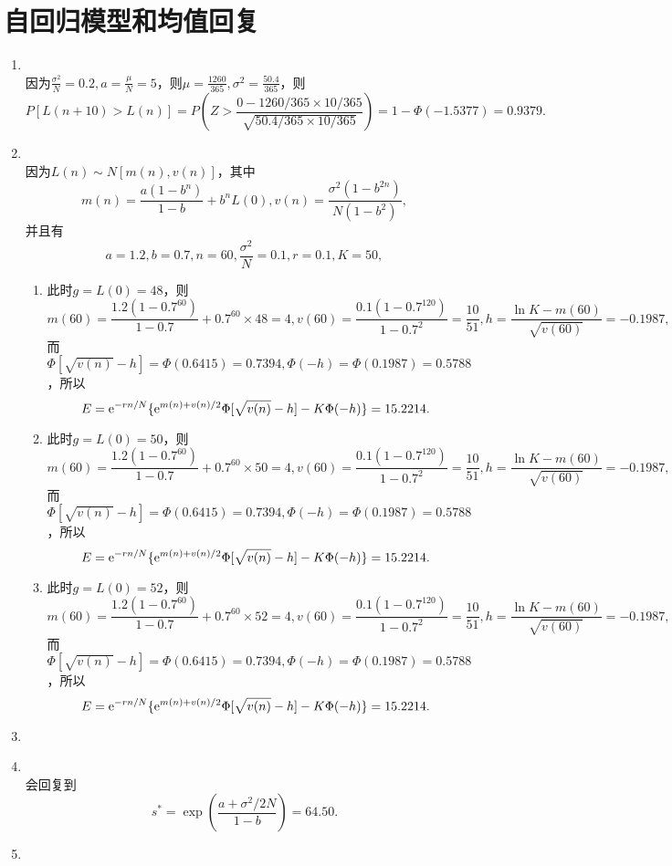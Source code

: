 \section{自回归模型和均值回复}
\begin{enumerate}[label=\arabic{section}.\arabic*]
    \item \sol\\
    因为$\displaystyle \frac{\sigma^2}{N}=0.2, a=\frac{\mu}{N}=5$，则$\displaystyle\mu=\frac{1260}{365},\sigma^2=\frac{50.4}{365}$，则
    \[P[L(n+10)>L(n)]=P\left(Z>\frac{0-1260/365 \times 10/365}{\sqrt{50.4/365 \times 10/365}}\right)=1-\Phi(-1.5377)=0.9379.\]
    \item \sol\\
    因为$L(n) \sim N[m(n), v(n)]$，其中
    \[m(n)=\frac{a(1-b^n)}{1-b}+b^n L(0),v(n)=\frac{\sigma^2(1-b^{2n})}{N(1-b^2)},\]
    并且有\[a=1.2,b=0.7,n=60,\frac{\sigma^2}{N}=0.1,r=0.1,K=50,\]
    \begin{enumerate}[label=\alph*)]
        \item 此时$g=L(0)=48$，则
        \[m(60)=\frac{1.2(1-0.7^{60})}{1-0.7}+0.7^{60}\times48=4,v(60)=\frac{0.1(1-0.7^{120})}{1-0.7^2}=\frac{10}{51},h=\frac{\ln K-m(60)}{\sqrt{v(60)}}=-0.1987,\]
        而$\Phi[\sqrt{v(n)}-h]=\Phi(0.6415)=0.7394,\Phi(-h)=\Phi(0.1987)=0.5788$，所以
        \[E=\mathrm{e}^{-rn/N}\{\mathrm{e}^{m(n)+v(n)/2}\Phi[\sqrt{v(n)}-h]-K\Phi(-h)\}=15.2214.\]
        \item 此时$g=L(0)=50$，则
        \[m(60)=\frac{1.2(1-0.7^{60})}{1-0.7}+0.7^{60}\times50=4,v(60)=\frac{0.1(1-0.7^{120})}{1-0.7^2}=\frac{10}{51},h=\frac{\ln K-m(60)}{\sqrt{v(60)}}=-0.1987,\]
        而$\Phi[\sqrt{v(n)}-h]=\Phi(0.6415)=0.7394,\Phi(-h)=\Phi(0.1987)=0.5788$，所以
        \[E=\mathrm{e}^{-rn/N}\{\mathrm{e}^{m(n)+v(n)/2}\Phi[\sqrt{v(n)}-h]-K\Phi(-h)\}=15.2214.\]
        \item 此时$g=L(0)=52$，则
        \[m(60)=\frac{1.2(1-0.7^{60})}{1-0.7}+0.7^{60}\times52=4,v(60)=\frac{0.1(1-0.7^{120})}{1-0.7^2}=\frac{10}{51},h=\frac{\ln K-m(60)}{\sqrt{v(60)}}=-0.1987,\]
        而$\Phi[\sqrt{v(n)}-h]=\Phi(0.6415)=0.7394,\Phi(-h)=\Phi(0.1987)=0.5788$，所以
        \[E=\mathrm{e}^{-rn/N}\{\mathrm{e}^{m(n)+v(n)/2}\Phi[\sqrt{v(n)}-h]-K\Phi(-h)\}=15.2214.\]
    \end{enumerate}
    \item \omitted
    \item \sol\\
    会回复到
    \[s^*=\exp\left(\frac{a+\sigma^2/2N}{1-b}\right)=64.50.\]
    \item \pro\\

\end{enumerate}
